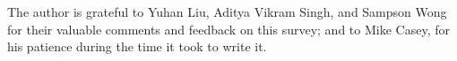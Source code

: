 \documentclass[biber]{nowfnt} %
\begin{document}
%

\begin{acknowledgements}
The author is grateful to Yuhan Liu, Aditya Vikram Singh, and Sampson Wong for their valuable comments and feedback on this survey; and to Mike Casey, for his patience during the time it took to write it.
\end{acknowledgements}
\end{document}
